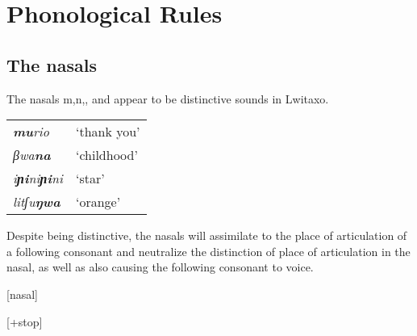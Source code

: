 \section{Phonological Rules}

\subsection{The nasals}

The nasals m,n,\palnas{}, and \engma{} appear to be distinctive sounds in Lwitaxo.

\begin{tabular}{ll}
\addlinespace
\toprule
{\it \textbf{mu}rio } & `thank you' \\
{\it  βwa\textbf{na} } & `childhood' \\
{\it  i\textbf{ɲi}ni\textbf{ɲi}ni } & `star' \\
{\it litʃu\textbf{ŋwa}} & `orange' \\
\bottomrule
\end{tabular}

Despite being distinctive, the nasals will assimilate to the place of articulation of a following consonant and neutralize the distinction of place of articulation in the nasal, as well as also causing the following consonant to voice.

  [nasal]  \inthe {}

  [+stop] \becomes [+voice] \inthe [+nasal] \environ

